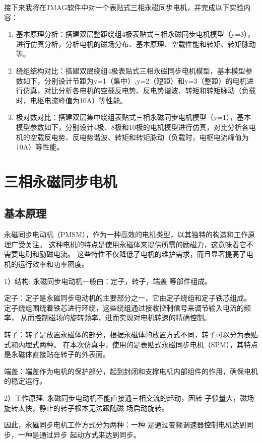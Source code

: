 \documentclass{thuemp}
\begin{document}
接下来我将在JMAG软件中对一个表贴式三相永磁同步电机，并完成以下实验内容：

\begin{enumerate}
	\item 基本原理分析：搭建双层整距绕组4极表贴式三相永磁同步电机模型（y=3），进行仿真分析，分析电机的磁场分布、基本原理、空载性能和转矩、转矩脉动等。
	\item 绕组结构对比：搭建双层绕组4极表贴式三相永磁同步电机模型，基本模型参数如下，分别设计节距为y=1（集中）,y=2（短距）和y=3（整距）的电机进行仿真，对比分析各电机的空载反电势、反电势谐波、转矩和转矩脉动（负载时，电枢电流峰值为10A）等性能。
	\item 极对数对比：搭建双层集中绕组表贴式三相永磁同步电机模型（y=1），基本模型参数如下，分别设计4极、8极和10极的电机模型进行仿真，对比分析各电机的空载反电势、反电势谐波、转矩和转矩脉动（负载时，电枢电流峰值为10A）等性能。
\end{enumerate}

\section{三相永磁同步电机}
\subsection{基本原理}
永磁同步电动机（PMSM），作为一种高效的电机类型，以其独特的构造和工作原理广受关注。
这种电机的特点是使用永磁体来提供所需的励磁力，这意味着它不需要电刷和励磁电流。
这些特性不仅降低了电机的维护需求，而且显著提高了电机的运行效率和功率密度。

1）结构: 永磁同步电动机一般由：定子，转子，端盖
等部件组成。

定子：定子是永磁同步电动机的主要部分之一，它由定子绕组和定子铁芯组成。
定子绕组围绕着铁芯进行环绕，这些绕组通过接收控制信号来调节输入电流的频率，
从而控制磁场的旋转频率，进而实现对电机转速的精确控制。

转子：转子是放置永磁体的部分，根据永磁体的放置方式不同，转子可以分为表贴式和内埋式两种。
在本次仿真中，使用的是表贴式永磁同步电机（SPM），其特点是永磁体直接贴在转子的外表面。

端盖：端盖作为电机的保护部分，起到封闭和支撑电机内部组件的作用，确保电机的稳定运行。

2）工作原理: 永磁同步电动机不能直接通三相交流的起动，因转
子惯量大，磁场旋转太快，静止的转子根本无法跟随磁
场启动旋转。

因此，永磁同步电机工作方式分为两种：一种
是通过变频调速器控制电机达到同步，一种是通过异步
起动方式来达到同步。
\end{document}
